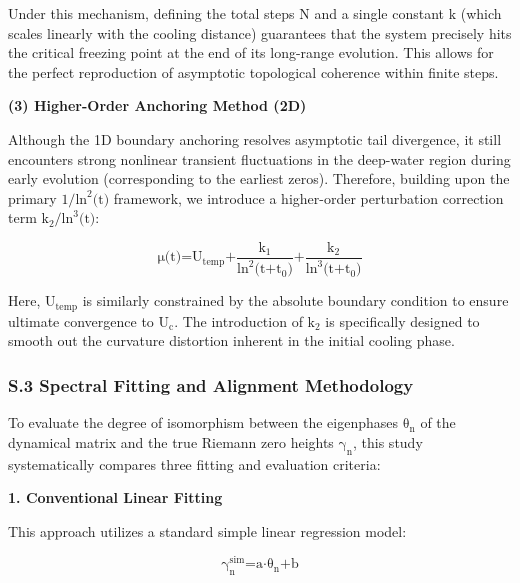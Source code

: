 Under this mechanism, defining the total steps \(\text{N}\) and a single
constant \(\text{k}\) (which scales linearly with the cooling distance)
guarantees that the system precisely hits the critical freezing point at
the end of its long-range evolution. This allows for the perfect
reproduction of asymptotic topological coherence within finite steps.

\textbf{(3) Higher-Order Anchoring Method (2D)}

Although the 1D boundary anchoring resolves asymptotic tail divergence,
it still encounters strong nonlinear transient fluctuations in the
deep-water region during early evolution (corresponding to the earliest
zeros). Therefore, building upon the primary
\(\text{1/}\text{ln}^{\text{2}}\text{(}\text{t}\text{)}\) framework, we
introduce a higher-order perturbation correction term
\(\text{k}_{\text{2}}\text{/}\text{ln}^{\text{3}}\text{(}\text{t}\text{)}\):

\[\text{μ}\text{(}\text{t}\text{)=}\text{U}_{\text{temp}}\text{+}\frac{\text{k}_{\text{1}}}{\text{ln}^{\text{2}}\text{(}\text{t}\text{+}\text{t}_{\text{0}}\text{)}}\text{+}\frac{\text{k}_{\text{2}}}{\text{ln}^{\text{3}}\text{(}\text{t}\text{+}\text{t}_{\text{0}}\text{)}}\]

Here, \(\text{U}_{\text{temp}}\) is similarly constrained by the
absolute boundary condition to ensure ultimate convergence to
\(\text{U}_{\text{c}}\). The introduction of \(\text{k}_{\text{2}}\) is
specifically designed to smooth out the curvature distortion inherent in
the initial cooling phase.

\hypertarget{s.3-spectral-fitting-and-alignment-methodology}{%
\subsubsection{\texorpdfstring{\textbf{S.3 Spectral Fitting and
Alignment
Methodology}}{S.3 Spectral Fitting and Alignment Methodology}}\label{s.3-spectral-fitting-and-alignment-methodology}}

To evaluate the degree of isomorphism between the eigenphases
\(\text{θ}_{\text{n}}\) of the dynamical matrix and the true Riemann
zero heights \(\text{γ}_{\text{n}}\), this study systematically compares
three fitting and evaluation criteria:

\textbf{1. Conventional Linear Fitting}

This approach utilizes a standard simple linear regression model:

\[\text{γ}_{\text{n}}^{\text{sim}}\text{=}\text{a}\text{⋅}\text{θ}_{\text{n}}\text{+}\text{b}\]


